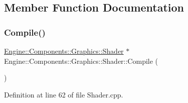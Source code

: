 \subsection{Member Function Documentation}
\mbox{\label{classEngine_1_1Components_1_1Graphics_1_1Shader_a348854b43d99bfe43e3d2b0cad5f103d}} 
\subsubsection{\texorpdfstring{Compile()}{Compile()}}
{\footnotesize\ttfamily \mbox{\hyperlink{classEngine_1_1Components_1_1Graphics_1_1Shader}{Engine\+::\+Components\+::\+Graphics\+::\+Shader}} $\ast$ Engine\+::\+Components\+::\+Graphics\+::\+Shader\+::\+Compile (\begin{DoxyParamCaption}{ }\end{DoxyParamCaption})}



Definition at line 62 of file Shader.\+cpp.


